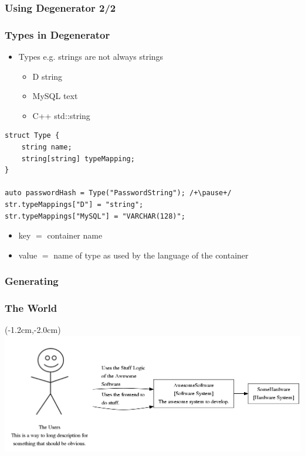 \documentclass[xelatex,13pt]{beamer}
\begin{document}
\begin{frame}
	\frametitle{Using Degenerator 2/2}
	
	\pause
	
	\pause
	
	\pause
	
\end{frame}

\begin{frame}[fragile]
	\frametitle{Types in Degenerator}
	\begin{itemize}
		\item Types \pause e.g. strings are not always strings
		\pause
		\begin{itemize}
			\item D string
			\item MySQL text
			\item C++ std::string
		\end{itemize}
	\end{itemize}
	\pause
	\begin{lstlisting}[basicstyle=\scriptsize]
struct Type {
    string name;
    string[string] typeMapping;
}

auto passwordHash = Type("PasswordString"); /+\pause+/
str.typeMappings["D"] = "string";
str.typeMappings["MySQL"] = "VARCHAR(128)";
\end{lstlisting}
	\vspace{-1cm}
\pause
\begin{itemize}
	\item key \(=\) container name
	\item value \(=\) name of type as used by the language of the container
\end{itemize}
\end{frame}

\begin{frame}
	\frametitle{Generating}
	
	
\end{frame}

\begin{frame}
	\frametitle{The World}
	\begin{textblock*}{0cm}(-1.2cm,-2.0cm)
		\includegraphics[width=1.0\paperwidth]{theworld.png}
	\end{textblock*}
\end{frame}
\end{document}
